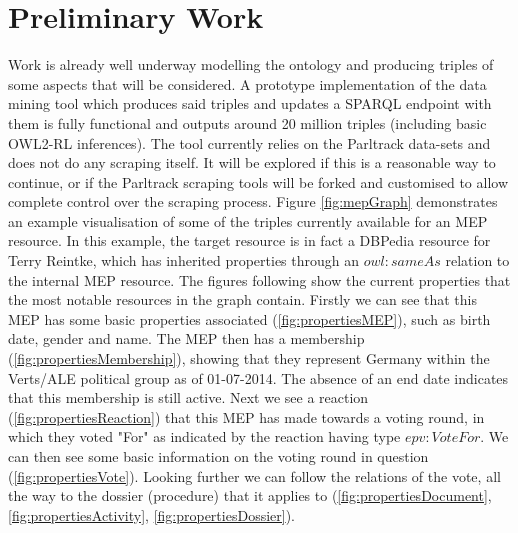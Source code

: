 \documentclass{article}
\begin{document}
\section{Preliminary Work}
Work is already well underway modelling the ontology and producing triples of some aspects that will be considered. A prototype implementation of the data mining tool which produces 
said triples and updates a SPARQL endpoint with them is fully functional and outputs around 20 million triples (including basic OWL2-RL inferences). The tool currently relies on the 
Parltrack data-sets and does not do any scraping itself. It will be explored if this is a reasonable way to continue, or if the Parltrack scraping tools will be forked and customised 
to allow complete control over the scraping process.
\newline
Figure \ref{fig:mepGraph} demonstrates an example visualisation of some of the triples currently available for an MEP resource. In this example, the target resource is in fact a 
DBPedia resource for Terry Reintke, which has inherited properties through an $owl:sameAs$ relation to the internal MEP resource. The figures following show the current properties 
that the most notable resources in the graph contain. 
\newline
Firstly we can see that this MEP has some basic properties associated (\ref{fig:propertiesMEP}), such as birth date, gender and name. The MEP then has a membership 
(\ref{fig:propertiesMembership}), showing that they represent Germany within the Verts/ALE political group as of 01-07-2014. The absence of an end date indicates that this membership 
is still active. Next we see a reaction (\ref{fig:propertiesReaction}) that this MEP has made towards a voting round, in which they voted "For" as indicated by the reaction having 
type $epv:VoteFor$. We can then see some basic information on the voting round in question (\ref{fig:propertiesVote}). Looking further we can follow the relations of the vote, all 
the way to the dossier (procedure) that it applies to (\ref{fig:propertiesDocument}, \ref{fig:propertiesActivity}, \ref{fig:propertiesDossier}).
\end{document}
